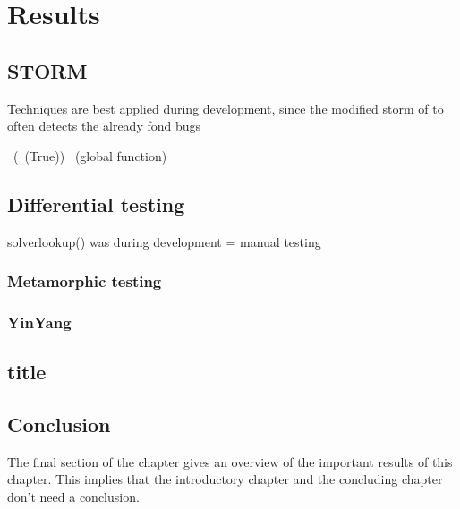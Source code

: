\chapter{Results}
\label{cha:6}

\section{STORM}
Techniques are best applied during development, since the modified storm of to often detects the already fond bugs

~(~(True))
~(global function)
\section{Differential testing}
solverlookup()  was during development = manual testing

\subsection{Metamorphic testing}
\subsection{YinYang}


\section{title}


\section{Conclusion}
The final section of the chapter gives an overview of the important results
of this chapter. This implies that the introductory chapter and the
concluding chapter don't need a conclusion.

